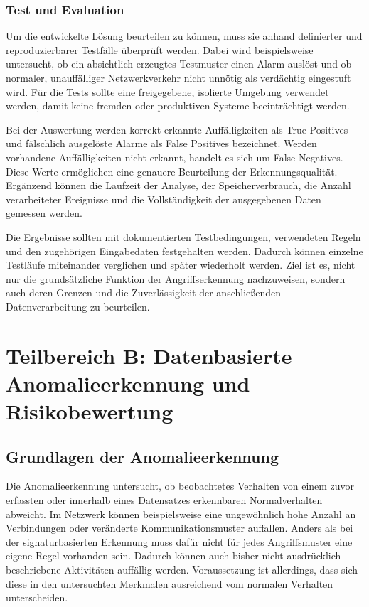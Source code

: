 \subsubsection{Test und Evaluation}

Um die entwickelte Lösung beurteilen zu können, muss sie anhand definierter und reproduzierbarer Testfälle überprüft werden. Dabei wird beispielsweise untersucht, ob ein absichtlich erzeugtes Testmuster einen Alarm auslöst und ob normaler, unauffälliger Netzwerkverkehr nicht unnötig als verdächtig eingestuft wird. Für die Tests sollte eine freigegebene, isolierte Umgebung verwendet werden, damit keine fremden oder produktiven Systeme beeinträchtigt werden.

Bei der Auswertung werden korrekt erkannte Auffälligkeiten als True Positives und fälschlich ausgelöste Alarme als False Positives bezeichnet. Werden vorhandene Auffälligkeiten nicht erkannt, handelt es sich um False Negatives. Diese Werte ermöglichen eine genauere Beurteilung der Erkennungsqualität. Ergänzend können die Laufzeit der Analyse, der Speicherverbrauch, die Anzahl verarbeiteter Ereignisse und die Vollständigkeit der ausgegebenen Daten gemessen werden.

Die Ergebnisse sollten mit dokumentierten Testbedingungen, verwendeten Regeln und den zugehörigen Eingabedaten festgehalten werden. Dadurch können einzelne Testläufe miteinander verglichen und später wiederholt werden. Ziel ist es, nicht nur die grundsätzliche Funktion der Angriffserkennung nachzuweisen, sondern auch deren Grenzen und die Zuverlässigkeit der anschließenden Datenverarbeitung zu beurteilen.

\section{Teilbereich B: Datenbasierte Anomalieerkennung und Risikobewertung}
\label{sec:teilbereich-b}

\subsection{Grundlagen der Anomalieerkennung}

Die Anomalieerkennung untersucht, ob beobachtetes Verhalten von einem zuvor erfassten oder innerhalb eines Datensatzes erkennbaren Normalverhalten abweicht. Im Netzwerk können beispielsweise eine ungewöhnlich hohe Anzahl an Verbindungen oder veränderte Kommunikationsmuster auffallen. Anders als bei der signaturbasierten Erkennung muss dafür nicht für jedes Angriffsmuster eine eigene Regel vorhanden sein. Dadurch können auch bisher nicht ausdrücklich beschriebene Aktivitäten auffällig werden. Voraussetzung ist allerdings, dass sich diese in den untersuchten Merkmalen ausreichend vom normalen Verhalten unterscheiden.

